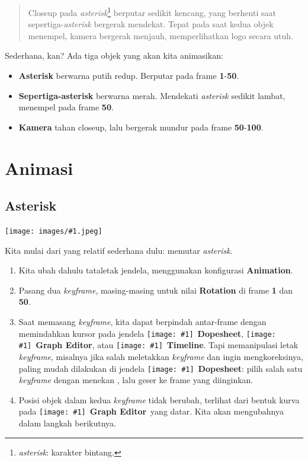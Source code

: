 \documentclass[11pt]{report}
\newcommand{\fig}[1]{
  \begingroup
  \centering
  \texttt{[image: images/\#1.jpeg]}
  \label{fig:#1}
  \endgroup
}
\def\iconwnd#1{\texttt{[image: \#1]}}
\def\fontwnd#1{{\bfseries#1}}
\def\wndDopesheet{
  \iconwnd{icons/wndDopesheet.jpeg}~\fontwnd{Dopesheet}}
\def\wndGraphEditor{
  \iconwnd{icons/wndGraphEditor.jpeg}~\fontwnd{Graph Editor}}
\def\wndTimeline{
  \iconwnd{icons/wndTimeline.jpeg}~\fontwnd{Timeline}}
\def\key#1{\fbox{\bfseries\ttfamily#1}}
\def\mka{\fbox{MKa}}
\begin{document}
\begin{quotation}
  Closeup pada \textsl{asterisk}\footnote{\textsl{asterisk}: karakter bintang.} berputar sedikit kencang, yang berhenti saat sepertiga-\textsl{asterisk} bergerak mendekat. Tepat pada saat kedua objek menempel, kamera bergerak menjauh, memperlihatkan logo secara utuh.
\end{quotation}

Sederhana, kan? Ada tiga objek yang akan kita animasikan:

\begin{itemize}
\item\textbf{Asterisk} berwarna putih redup. Berputar pada frame \textbf{1}-\textbf{50}.
\item\textbf{Sepertiga-asterisk} berwarna merah. Mendekati \textsl{asterisk} sedikit lambat, menempel pada frame \textbf{50}.
\item\textbf{Kamera} tahan closeup, lalu bergerak mundur pada frame \textbf{50}-\textbf{100}.
\end{itemize}

\section{Animasi}

\subsection{Asterisk}

\fig{logo-000}

Kita mulai dari yang relatif sederhana dulu: memutar \textsl{asterisk}.

\begin{enumerate}
\item Kita ubah dahulu tataletak jendela, menggunakan konfigurasi \textbf{Animation}.

\item Pasang dua \textsl{keyframe}, masing-masing untuk nilai \textbf{Rotation} di frame \textbf{1} dan \textbf{50}.

\item Saat memasang \textsl{keyframe}, kita dapat berpindah antar-frame dengan memindahkan kursor pada jendela \wndDopesheet, \wndGraphEditor, atau \wndTimeline. Tapi memanipulasi letak \textsl{keyframe}, misalnya jika salah meletakkan \textsl{keyframe} dan ingin mengkoreksinya, paling mudah dilakukan di jendela \wndDopesheet: pilih salah satu \textsl{keyframe} dengan menekan \mka, lalu geser \key{G} ke frame yang diinginkan.

\item Posisi objek dalam kedua \textsl{keyframe} tidak berubah, terlihat dari bentuk kurva pada \wndGraphEditor\ yang datar. Kita akan mengubahnya dalam langkah berikutnya.
\end{enumerate}
\end{document}
